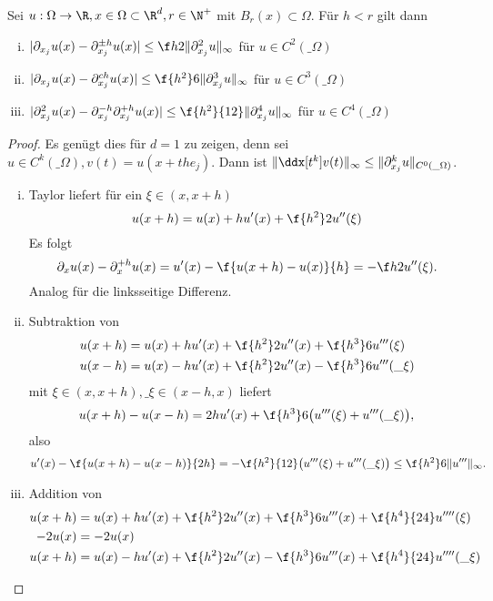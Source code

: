 \begin{st}[Approximationsgüte] \label{2.2}
	Sei $u: \Omega \to \R, x \in \Omega \subset \R^d, r \in \N^+$ mit $B_r(x) \subset \Omega$.	
	Für $h < r$ gilt dann
	\begin{enumerate}[i)]
		\item
			$|\partial_{x_j} u(x) - \partial_{x_j}^{\pm h} u(x)| \le \f h2 \|\partial_{x_j}^2 u\|_\infty$ für $u \in C^2(\_\Omega)$
		\item
			$|\partial_{x_j} u(x) - \partial_{x_j}^{c h} u(x)| \le \f {h^2}6 \|\partial_{x_j}^3 u\|_\infty$ für $u \in C^3(\_\Omega)$
		\item
			$|\partial_{x_j}^2 u(x) - \partial_{x_j}^{-h} \partial_{x_j}^{+h} u(x)| \le \f {h^2}{12} \|\partial_{x_j}^4 u\|_\infty$ für $u \in C^4(\_\Omega)$
	\end{enumerate}
	\begin{proof}
		Es genügt dies für $d = 1$ zu zeigen, denn  sei $u \in C^k(\_\Omega), v(t) = u(x + th e_j)$.
		Dann ist $\|\ddx[t^k] v(t)\|_\infty \le \|\partial_{x_j}^k u\|_{C^0(\_\Omega)}$.
		\begin{enumerate}[i)]
			\item
				Taylor liefert für ein $\xi \in (x, x + h)$
				\[
					u(x+h) = u(x) + hu'(x) + \f {h^2}2 u''(\xi)
				\]
				Es folgt
				\[
					\partial_x u(x) - \partial_x^{+h} u(x)
					= u'(x) - \f{u(x+h) - u(x)}{h}
					= - \f h2 u''(\xi).
				\]
				Analog für die linksseitige Differenz.
			\item
				Subtraktion von
				\begin{align*}
					u(x+h) &= u(x) + hu'(x) + \f {h^2}2 u''(x) + \f {h^3}6 u'''(\xi) \\
					u(x-h) &= u(x) - hu'(x) + \f {h^2}2 u''(x) - \f {h^3}6 u'''(\_\xi) \\
				\end{align*}
				mit $\xi \in (x,x+h), \_\xi \in (x-h,x)$ liefert
				\[
					u(x+h) - u(x-h) = 2h u'(x) + \f{h^3}6 \big(u'''(\xi) + u'''(\_\xi)\big),
				\]
				also
				\[
					u'(x) - \f{u(x+h) - u(x-h)}{2h}
					= - \f{h^2}{12} \big( u'''(\xi) + u'''(\_\xi) \big)
					\le \f{h^2}6 \|u'''\|_\infty.
				\]
			\item
				Addition von
				\begin{align*}
					u(x+h) &= u(x) + hu'(x) + \f{h^2}2 u''(x) + \f {h^3}6 u'''(x) + \f{h^4}{24} u''''(\xi) \\
					-2u(x) &= -2u(x) \\
					u(x+h) &= u(x) - hu'(x) + \f{h^2}2 u''(x) - \f {h^3}6 u'''(x) + \f{h^4}{24} u''''(\_\xi) \\

\end{align*}
\end{enumerate}
\end{proof}
\end{st}
